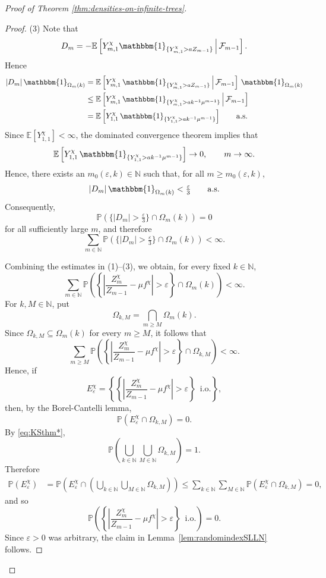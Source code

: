 \documentclass[11pt]{article}
\numberwithin{equation}{section}
\theoremstyle{plain}
\newcommand{\N}{\mathbb N}
\newcommand{\EE}{\mathbb E}
\newcommand{\PP}{\mathbb{P}}
\begin{document}
\begin{proof}[Proof of Theorem \ref{thm:densities-on-infinite-trees}]
\begin{proof}
\medskip\noindent
(3) Note that
\[
D_m = -\EE\left[ Y^{\chi}_{m,1}\mathbbm{1}_{\{Y^{\chi}_{m,1}>aZ_{m-1}\}} \,\middle|\, \mathcal{F}_{m-1} \right].
\]
Hence
\[
\begin{aligned}
|D_m|\, \mathbbm{1}_{\Omega_m(k)}
&
= \EE\left[ Y_{m,1}^{\chi} \, \mathbbm{1}_{\{Y_{m,1}^{\chi}>aZ_{m-1}\}} \,\middle|\, \mathcal{F}_{m-1} \right]\, \mathbbm{1}_{\Omega_m(k)}
\\&
\leq \EE\left[ Y_{m,1}^{\chi}\, \mathbbm{1}_{\{Y_{m,1}^{\chi} > ak^{-1}\mu^{m-1}\}} \,\middle|\, \mathcal{F}_{m-1} \right]  
\\&
= \EE\left[ Y_{1,1}^{\chi}\, \mathbbm{1}_{\{Y_{1,1}^{\chi}>ak^{-1}\mu^{m-1}\}} \right]
\qquad \mathrm{a.s.}
\end{aligned}
\]
Since $\EE[Y_{1,1}^{\chi}]<\infty$, the dominated convergence theorem implies that
\[
\EE\left[ Y_{1,1}^{\chi}\, \mathbbm{1}_{\{Y_{1,1}^{\chi} > ak^{-1}\mu^{m-1}\}} \right] \to 0, \qquad m\to\infty.
\]
Hence, there exists an $m_0(\varepsilon,k)\in\N$ such that, for all $m\geq m_0(\varepsilon,k)$,
\[
|D_m| \, \mathbbm{1}_{\Omega_m(k)} < \tfrac{\varepsilon}{3} \qquad \mathrm{a.s.}
\]
Consequently,
\[
\PP\left( \{|D_m|>\tfrac{\varepsilon}{3}\}\cap\Omega_m(k) \right) = 0
\]
for all sufficiently large $m$, and therefore
\[
\sum_{m\in\N} \PP\left( \{|D_m|>\tfrac{\varepsilon}{3}\}\cap\Omega_m(k) \right) < \infty.
\]


\medskip 
Combining the estimates in (1)--(3), we obtain, for every fixed $k\in\N$,
\[
\sum_{m\in\N} \PP\left( \left\{ \left| \frac{Z_m^\chi}{Z_{m-1}} - \mu f^\chi \right|>\varepsilon \right\} \cap \Omega_m(k) \right) <\infty.
\]
For $k,M\in\N$, put
\[
\Omega_{k,M} = \bigcap_{m\geq M} \Omega_m(k).
\]
Since $\Omega_{k,M}\subseteq \Omega_m(k)$ for every $m\geq M$, it follows that
\[
\sum_{m\geq M} \PP\left( \left\{ \left| \frac{Z_m^\chi}{Z_{m-1}}-\mu f^{\chi} \right|>\varepsilon \right\} \cap \Omega_{k,M} \right) < \infty.
\]
Hence, if
\[
E_{\varepsilon}^{\chi} = \left\{\left\{ \left| \frac{Z_m^{\chi}}{Z_{m-1}}-\mu f^{\chi} \right| > \varepsilon \right\}
\,\,\, \mathrm{i.o.}\right\},
\]
then, by the Borel-Cantelli lemma,
\[
\PP\left(E_{\varepsilon}^{\chi} \cap \Omega_{k,M} \right)=0.
\]
By \eqref{eq:KSthm*},
\[
\PP\left( \bigcup_{k\in\N}\bigcup_{M\in\N}\Omega_{k,M} \right) = 1.
\]
Therefore
\[
\begin{aligned}
\PP\left(E_{\varepsilon}^{\chi}\right)
&=
\PP\left(E_{\varepsilon}^{\chi}\cap\left(\bigcup_{k\in\N}\bigcup_{M\in\N}\Omega_{k,M}\right)\right) 
\leq\sum_{k\in\N}\sum_{M\in\N}\PP\left(E_{\varepsilon}^{\chi}\cap \Omega_{k,M}\right)=0,
\end{aligned}
\]
and so
\[
\PP \left(\left\{ \left| \frac{Z_m^{\chi}}{Z_{m-1}}-\mu f^{\chi} \right| > \varepsilon \right\}
\,\,\, \mathrm{i.o.}\right) = 0.
\]
Since $\varepsilon>0$ was arbitrary, the claim in Lemma~\ref{lem:randomindexSLLN} follows.
\end{proof}


\end{proof}
\end{document}
